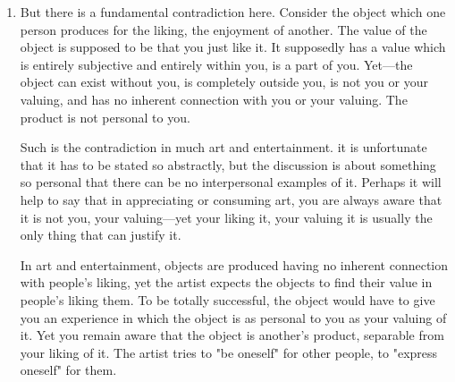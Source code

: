 \documentclass[10pt,twoside,draft]{memoir}
\begin{document}
{\begin{enumerate}
People have every reason, then, to ask the artist: Is your product good for 
me even if I don't like or enjoy it? This question really lays art open. One of 
the distinguishing features of art has always been that it is very difficult to 
defend art without referring to people's liking or enjoying it. (Functions of 
art such as making money or glorifying the social order are real enough, but 
they are rarely cited in defense of art. Let us put them aside.) When one 
artist shows his latest production to another, all he can usually ask is "Do 
you like it?" Once the "scientific" justification of art is discredited, the 
artist usually has to admit: If you don't like or enjoy my product, there's no 
reason why you should "consume" it. 

There are exceptions. Art sometimes becomes the sole channel for political 
dissent, the sole arena in which oppressive social relations can be 
transcended. Even so, subjectivity of value remains a feature which 
distinguishes art and entertainment from other activities. Thus art is 
historically a leisure activity. 

\item But there is a fundamental contradiction here. Consider the object which 
one person produces for the liking, the enjoyment of another. The value of 
the object is supposed to be that you just like it. It supposedly has a value 
which is entirely subjective and entirely within you, is a part of you. Yet---the 
object can exist without you, is completely outside you, is not you or your 
valuing, and has no inherent connection with you or your valuing. The 
product is not personal to you. 

Such is the contradiction in much art and entertainment. it is unfortunate 
that it has to be stated so abstractly, but the discussion is about something 
so personal that there can be no interpersonal examples of it. Perhaps it will 
help to say that in appreciating or consuming art, you are always aware that 
it is not you, your valuing---yet your liking it, your valuing it is usually the 
only thing that can justify it. 

In art and entertainment, objects are produced having no inherent 
connection with people's liking, yet the artist expects the objects to find 
their value in people's liking them. To be totally successful, the object would 
have to give you an experience in which the object is as personal to you as 
your valuing of it. Yet you remain aware that the object is another's 
product, separable from your liking of it. The artist tries to "be oneself" for 
other people, to "express oneself" for them. 


\end{enumerate}}
\end{document}
